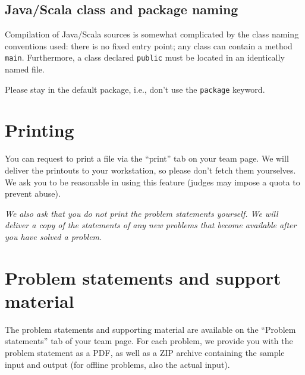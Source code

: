\subsection[Java/Scala class and package naming]{Java/Scala class and package naming}
Compilation of Java/Scala sources is somewhat complicated by the class
naming conventions used: there is no fixed entry point; any class can
contain a method \texttt{main}. Furthermore, a class declared
\texttt{public} must be located in an identically named file.

Please stay in the default package, i.e., don't use the \texttt{package} keyword.

\section{Printing}
You can request to print a file via the ``print'' tab on your team page.
We will deliver the printouts to your workstation, so please
don't fetch them yourselves. We ask you to be
reasonable in using this feature (judges may impose a quota to prevent
abuse).

\emph{We also ask that you do not print the problem statements
yourself. We will deliver a copy of the statements of any new
problems that become available after you have solved a problem.}

\section{Problem statements and support material}
The problem statements and supporting material are available
on the ``Problem statements'' tab of your team page.
For each problem, we provide you with the problem statement
as a PDF, as well as a ZIP archive containing the sample input and output
(for offline problems, also the actual input).

